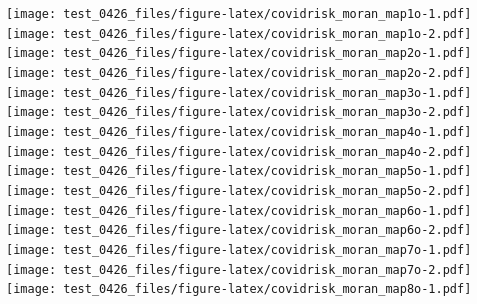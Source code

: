 \documentclass[
]{article}
\begin{document}
\texttt{[image: test\_0426\_files/figure-latex/covidrisk\_moran\_map1o-1.pdf]}
\texttt{[image: test\_0426\_files/figure-latex/covidrisk\_moran\_map1o-2.pdf]}
\newpage
\texttt{[image: test\_0426\_files/figure-latex/covidrisk\_moran\_map2o-1.pdf]}
\texttt{[image: test\_0426\_files/figure-latex/covidrisk\_moran\_map2o-2.pdf]}
\newpage
\texttt{[image: test\_0426\_files/figure-latex/covidrisk\_moran\_map3o-1.pdf]}
\texttt{[image: test\_0426\_files/figure-latex/covidrisk\_moran\_map3o-2.pdf]}
\newpage
\texttt{[image: test\_0426\_files/figure-latex/covidrisk\_moran\_map4o-1.pdf]}
\texttt{[image: test\_0426\_files/figure-latex/covidrisk\_moran\_map4o-2.pdf]}
\newpage
\texttt{[image: test\_0426\_files/figure-latex/covidrisk\_moran\_map5o-1.pdf]}
\texttt{[image: test\_0426\_files/figure-latex/covidrisk\_moran\_map5o-2.pdf]}
\newpage
\texttt{[image: test\_0426\_files/figure-latex/covidrisk\_moran\_map6o-1.pdf]}
\texttt{[image: test\_0426\_files/figure-latex/covidrisk\_moran\_map6o-2.pdf]}
\newpage
\texttt{[image: test\_0426\_files/figure-latex/covidrisk\_moran\_map7o-1.pdf]}
\texttt{[image: test\_0426\_files/figure-latex/covidrisk\_moran\_map7o-2.pdf]}
\newpage
\texttt{[image: test\_0426\_files/figure-latex/covidrisk\_moran\_map8o-1.pdf]}
\newpage
\end{document}
